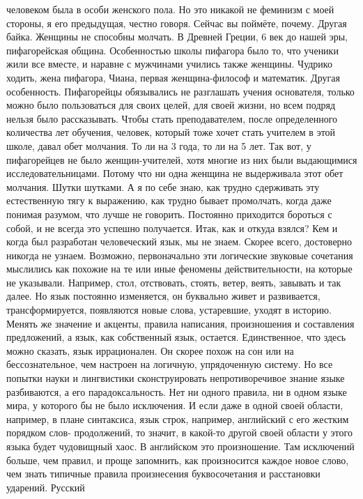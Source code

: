 человеком была в особи женского пола. Но это никакой не феминизм с моей стороны,
я его предыдущая, честно говоря. Сейчас вы поймёте, почему. Другая байка.
Женщины не способны молчать. В Древней Греции, 6 век до нашей эры, пифагорейская
община. Особенностью школы пифагора было то, что ученики жили все вместе, и
наравне с мужчинами учились также женщины. Чудрико ходить, жена пифагора, Чиана,
первая женщина-философ и математик. Другая особенность. Пифагорейцы обязывались
не разглашать учения основателя, только можно было пользоваться для своих целей,
для своей жизни, но всем подряд нельзя было рассказывать. Чтобы стать
преподавателем, после определенного количества лет обучения, человек, который
тоже хочет стать учителем в этой школе, давал обет молчания. То ли на 3 года, то
ли на 5 лет. Так вот, у пифагорейцев не было женщин-учителей, хотя многие из них
были выдающимися исследовательницами. Потому что ни одна женщина не выдерживала
этот обет молчания. Шутки шутками. А я по себе знаю, как трудно сдерживать эту
естественную тягу к выражению, как трудно бывает промолчать, когда даже понимая
разумом, что лучше не говорить. Постоянно приходится бороться с собой, и не
всегда это успешно получается. Итак, как и откуда взялся? Кем и когда был
разработан человеческий язык, мы не знаем. Скорее всего, достоверно никогда не
узнаем. Возможно, первоначально эти логические звуковые сочетания мыслились как
похожие на те или иные феномены действительности, на которые не указывали.
Например, стол, отствовать, стоять, ветер, веять, завывать и так далее. Но язык
постоянно изменяется, он буквально живет и развивается, трансформируется,
появляются новые слова, устаревшие, уходят в историю. Менять же значение и
акценты, правила написания, произношения и составления предложений, а язык, как
собственный язык, остается. Единственное, что здесь можно сказать, язык
иррационален. Он скорее похож на сон или на бессознательное, чем настроен на
логичную, упрядоченную систему. Но все попытки науки и лингвистики
сконструировать непротиворечивое знание языке разбиваются, а его
парадоксальность. Нет ни одного правила, ни в одном языке мира, у которого бы не
было исключения. И если даже в одной своей области, например, в плане
синтаксиса, язык строк, например, английский с его жестким порядком слов-
продолжений, то значит, в какой-то другой своей области у этого языка будет
чудовищный хаос. В английском это произношение. Там исключений больше, чем
правил, и проще запомнить, как произносится каждое новое слово, чем знать
типичные правила произнесения буквосочетания и расстановки ударений. Русский
